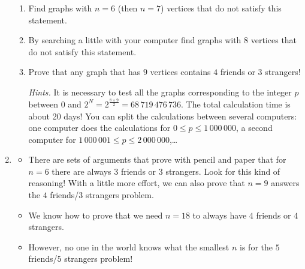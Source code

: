 \documentclass[11pt,class=report,crop=false]{standalone}
\begin{document}
\begin{activite}[To go further]
\begin{enumerate}
  \begin{enumerate}
    \item Find graphs with $n=6$ (then $n=7$) vertices that do not satisfy this statement.
    \item By searching a little with your computer find graphs with $8$ vertices that do not satisfy this statement.
    \item Prove that any graph that has $9$ vertices contains $4$ friends or $3$ strangers! 
     
  \emph{Hints.} It is necessary to test all the graphs corresponding to the  integer $p$ between $0$ and $2^N = 2^{\frac{8 \times 9}{2}} = 68\,719\,476\,736$. The total calculation time is about 20 days! You can split the calculations between several computers: one computer does the calculations for $0 \le p \le 1\,000\,000$, a second computer for $1\,000\,001 \le p \le 2\,000\,000$,\ldots
    
  \end{enumerate}
  
  \item 
  \begin{itemize}
    \item There are sets of arguments that prove with pencil and paper that for $n=6$ there are always $3$ friends or $3$ strangers. Look for this kind of reasoning! With a little more effort, we can also prove that $n=9$ answers the $4$ friends/$3$ strangers problem.
    
    \item We know how to prove that we need $n=18$ to always have $4$ friends or $4$ strangers.
    
    \item However, no one in the world knows what the smallest $n$ is for the $5$ friends/$5$ strangers problem!
  \end{itemize}

\end{enumerate}

\end{activite}
\end{document}
